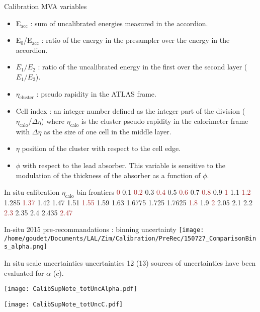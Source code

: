 \begin{frame}{Calibration MVA variables}
  \begin{itemize}
  \item E\(_{\text{acc}}\) : sum of uncalibrated energies measured in the accordion.
  \item E\(_{\text{0}}\)/E\(_{\text{acc}}\) : ratio of the energy in the presampler over the energy in the accordion.
  \item $E_1/E_2$ : ratio of the uncalibrated energy in the first over the second layer ($E_1/E_2$).
  \item \(\eta_{\text{cluster}}\) :  pseudo rapidity in the ATLAS frame.
  \item Cell index : an integer number defined as the integer part of the division ( \(\eta_{\text{calo}}\)/\(\Delta \eta\)) where \(\eta_{\text{calo}}\) is the cluster pseudo rapidity in the calorimeter frame with \(\Delta \eta\) as the size of one cell in the middle layer. 
  \item $\eta$ position of the cluster with respect to the cell edge.
  \item $\phi$ with respect to the lead absorber. This variable is sensitive to the modulation of the thickness of the absorber as a function of $\phi$.
  \end{itemize}
\end{frame}

\begin{frame}{In situ calibration $\eta_\text{calo}$ bin frontiers}
        {\tiny \textcolor{brown}{0} 0.1 \textcolor{brown}{0.2} 0.3 \textcolor{brown}{0.4} 0.5 \textcolor{brown}{0.6} 0.7 \textcolor{brown}{0.8} 0.9 \textcolor{brown}{1} 1.1 \textcolor{brown}{1.2} 1.285 \textcolor{brown}{1.37} 1.42 1.47 1.51 \textcolor{brown}{1.55} 1.59 1.63 1.6775 1.725 1.7625 \textcolor{brown}{1.8} 1.9 \textcolor{brown}{2} 2.05 2.1 2.2 \textcolor{brown}{2.3} 2.35 2.4 2.435 \textcolor{brown}{2.47}}
\end{frame}

\begin{frame}{In-situ 2015 pre-recommandations : binning uncertainty}
  \centering
  \texttt{[image: /home/goudet/Documents/LAL/Zim/Calibration/PreRec/150727\_ComparisonBins\_alpha.png]}
  \end{frame}
\begin{frame}{In situ scale uncertainties uncertainties}
  12 (13) sources of uncertainties have been evaluated for $\alpha$ ($c$).

    \begin{minipage}{0.49\linewidth} 
      \texttt{[image: CalibSupNote\_totUncAlpha.pdf]}
  \end{minipage}
  \hfill
  \begin{minipage}{0.49\linewidth}
    \texttt{[image: CalibSupNote\_totUncC.pdf]}
  \end{minipage}

\end{frame}

